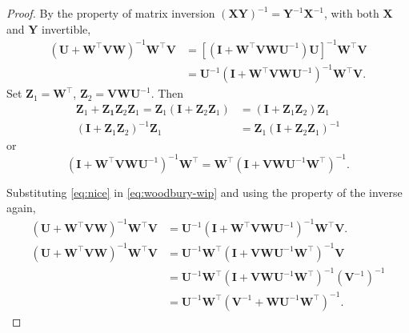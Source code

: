 \begin{proof}
    By the property of matrix inversion 
    $(\mathbf{X}\mathbf{Y})^{-1} = 
      \mathbf{Y}^{-1}\mathbf{X}^{-1}$, with both $\mathbf{X}$ and $\mathbf{Y}$ invertible,
    \begin{align}
        (\mathbf{U} + \mathbf{W}^\top\mathbf{V}\mathbf{W})^{-1} 
        \mathbf{W}^\top\mathbf{V}
        &=
        [(
            \mathbf{I} + 
            \mathbf{W}^\top\mathbf{V}\mathbf{W}\mathbf{U}^{-1}
        )\mathbf{U}]^{-1} 
        \mathbf{W}^\top\mathbf{V} \\
        &=
        \mathbf{U}^{-1}
        (
            \mathbf{I} + 
            \mathbf{W}^\top\mathbf{V}\mathbf{W}\mathbf{U}^{-1}
        )^{-1} 
        \mathbf{W}^\top\mathbf{V}.
    \label{eq:woodbury-wip}
    \end{align}
    Set 
    $\mathbf{Z}_1 = \mathbf{W}^\top$, 
    $\mathbf{Z}_2 = \mathbf{V}\mathbf{W}\mathbf{U}^{-1}$.
    Then 
    \begin{align}
        \mathbf{Z}_1 + \mathbf{Z_1}\mathbf{Z}_2\mathbf{Z}_1
        =
        \mathbf{Z}_1 (\mathbf{I} + \mathbf{Z}_2\mathbf{Z}_1)
        &=
        (\mathbf{I} + \mathbf{Z}_1\mathbf{Z}_2)\mathbf{Z}_1 
    \\
        (\mathbf{I} + \mathbf{Z}_1\mathbf{Z}_2)^{-1} \mathbf{Z}_1
        &= 
        \mathbf{Z}_1 (\mathbf{I} + \mathbf{Z}_2\mathbf{Z}_1)^{-1}
    \end{align}
    or
    \begin{equation}
        (
            \mathbf{I} + 
            \mathbf{W}^\top\mathbf{V}\mathbf{W}\mathbf{U}^{-1}
        )^{-1} 
        \mathbf{W}^\top
        =
        \mathbf{W}^\top
        (
            \mathbf{I} + 
            \mathbf{V}\mathbf{W}\mathbf{U}^{-1}\mathbf{W}^\top
        )^{-1}. 
    \label{eq:nice}
    \end{equation}

    Substituting \cref{eq:nice} in \cref{eq:woodbury-wip} 
    and using the property of the inverse again,
    \begin{align}
        (\mathbf{U} + \mathbf{W}^\top\mathbf{V}\mathbf{W})^{-1} 
        \mathbf{W}^\top\mathbf{V}
        &=
        \mathbf{U}^{-1}
        (
            \mathbf{I} + 
            \mathbf{W}^\top\mathbf{V}\mathbf{W}\mathbf{U}^{-1}
        )^{-1} 
        \mathbf{W}^\top\mathbf{V}.
    \\
        (\mathbf{U} + \mathbf{W}^\top\mathbf{V}\mathbf{W})^{-1} 
        \mathbf{W}^\top\mathbf{V}
        &=
        \mathbf{U}^{-1}
        \mathbf{W}^\top
        (
            \mathbf{I} + 
            \mathbf{V}\mathbf{W}\mathbf{U}^{-1}\mathbf{W}^\top
        )^{-1}\mathbf{V}
    \\
        &=
        \mathbf{U}^{-1}
        \mathbf{W}^\top
        (
            \mathbf{I} + 
            \mathbf{V}\mathbf{W}\mathbf{U}^{-1}\mathbf{W}^\top
        )^{-1}(\mathbf{V}^{-1})^{-1}
    \\
        &=
        \mathbf{U}^{-1}
        \mathbf{W}^\top
        (
            \mathbf{V}^{-1} + 
            \mathbf{W}\mathbf{U}^{-1}\mathbf{W}^\top
        )^{-1}.
    \end{align}
\end{proof}
